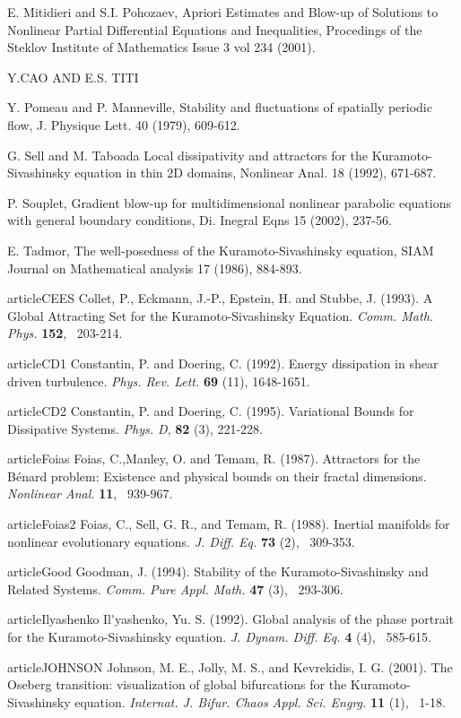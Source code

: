 E. Mitidieri and S.I. Pohozaev, Apriori Estimates and Blow-up of Solutions to Nonlinear Partial Differential Equations and Inequalities, Procedings of the Steklov Institute of Mathematics Issue 3 vol 234 (2001).

Y.CAO AND E.S. TITI

Y. Pomeau and P. Manneville, Stability and fluctuations of spatially periodic flow, J. Physique Lett. 40 (1979), 609-612.

G. Sell and M. Taboada Local dissipativity and attractors for the Kuramoto-Sivashinsky equation in thin 2D domains, Nonlinear Anal. 18 (1992), 671-687.

P. Souplet, Gradient blow-up for multidimensional nonlinear parabolic equations with general boundary conditions, Di. Inegral Eqns 15 (2002), 237-56.

E. Tadmor, The well-posedness of the Kuramoto-Sivashinsky equation, SIAM Journal on Mathematical analysis 17 (1986), 884-893.


article{CEES}
Collet, P., Eckmann, J.-P., Epstein, H. and Stubbe, J. (1993).
A Global Attracting Set for the Kuramoto-Sivashinsky Equation.
{\it Comm. Math. Phys.}
{\bf 152}, ~203-214.

article{CD1} Constantin, P. and Doering, C. (1992).
Energy dissipation in shear driven turbulence.
{\it Phys. Rev. Lett.} {\bf 69} (11), 1648-1651.

article{CD2} Constantin, P. and Doering, C. (1995).
Variational Bounds for Dissipative Systems.
{\it Phys. D}, {\bf 82} (3), 221-228.

article{Foias}
Foias, C.,Manley, O. and Temam, R. (1987).
Attractors for the B\'{e}nard problem:
Existence and physical bounds on their fractal dimensions.
{\it Nonlinear Anal.}
{\bf 11}, ~939-967.

article{Foias2}
Foias, C., Sell, G. R., and  Temam, R. (1988).
Inertial manifolds for nonlinear evolutionary equations.
{\it J. Diff. Eq.}
{\bf 73} (2), ~309-353.

article{Good}
Goodman, J. (1994).
Stability of the Kuramoto-Sivashinsky and Related Systems.
{\it Comm. Pure Appl. Math.}
{\bf 47} (3), ~293-306.

article{Ilyashenko}
Il\'{}yashenko, Yu. S. (1992).
Global analysis of the phase portrait for the Kuramoto-Sivashinsky equation.
{\it J. Dynam. Diff. Eq.}
{\bf 4}  (4), ~585-615.

article{JOHNSON}
 Johnson, M. E., Jolly, M. S., and  Kevrekidis, I. G. (2001).
The Oseberg transition: visualization of global bifurcations for the
Kuramoto-Sivashinsky equation.
{\it Internat. J. Bifur. Chaos Appl. Sci. Engrg.}
{\bf 11} (1), ~1-18.

